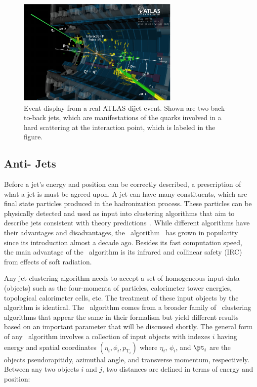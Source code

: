 \begin{figure}
	\centering
	\includegraphics[width=0.7\textwidth]{figures/jets.pdf} 
	\caption{ Event display from a real ATLAS dijet event. Shown are two back-to-back jets, which are manifestations of the quarks involved in a hard scattering at the interaction point, which is labeled in the figure. }
	\label{fig:atlasjets}
\end{figure}


\subsection{\mbox{Anti-\kt} Jets} 
Before a jet's energy and position can be correctly described, a prescription of what a jet is must be agreed upon. A jet can have many constituents, which are final state particles produced in the hadronization process. These particles can be physically detected and used as input into clustering algorithms that aim to describe jets consistent with theory predictions~\cite{Ellis:1993tq,Dokshitzer:1997in,Wobisch:1998wt,Blazey:2000qt}. While different algorithms have their advantages and disadvantages, the \antikt\ algorithm~\cite{Cacciari:2008gp} has grown in popularity since its introduction almost a decade ago. Besides its fast computation speed, the main advantage of the \antikt\ algorithm is its infrared and collinear safety (IRC) from effects of soft radiation.

Any jet clustering algorithm needs to accept a set of homogeneous input data (objects) such as the four-momenta of particles, calorimeter tower energies, topological calorimeter cells, etc. The treatment of these input objects by the algorithm is identical. The \antikt\ algorithm comes from a broader family of \kt\ clustering algorithms that appear the same in their formalism but yield different results based on an important parameter that will be discussed shortly. The general form of any \kt\ algorithm involves a collection of input objects with indexes $i$ having energy and spatial coordinates $(\eta_{i}, \phi_{i}, p_{\mathrm{T}_{i}})$ where $\eta_{i}$, $\phi_{i}$, and $\pt_{i}$ are the objects pseudorapitidy, azimuthal angle, and transverse momentum, respectively. Between any two objects $i$ and $j$, two distances are defined in terms of energy and position:

